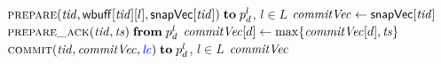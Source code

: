 \begin{algorithm*}[t]
\begin{algorithmic}[1]
      \hStatex
      \State \send $\textsc{prepare}(\mathit{tid}, {\sf wbuff}[\mathit{tid}][l], {\sf snapVec}[\mathit{tid}])
        \;{\bf to}\; p^{l}_{d}$, $l \in L$
        \label{line:commitcausal-call-prepare}
      \State \var $\mathit{commitVec} \gets {\sf snapVec}[\mathit{tid}]$
        \label{line:commitcausal-commitvc}
        \State \wait\receive $\textsc{prepare\_ack}(\mathit{tid}, \mathit{ts}) \;{\bf from}\; p^{l}_{d}$
          \label{line:commitcausal-wait-prepareack}
        \State $\mathit{commitVec}[d] \gets \max \{\mathit{commitVec}[d], \mathit{ts}\}$
          \label{line:commitcausal-commitvc-d}
      \EndFor
      \State \send $\Call{commit}{\tidvar, \commitvc, \lccolor{\lcvar}}
        \sendto p^{l}_{d}$, $l \in L$
      \label{line:commitcausal-call-commit}
      \State \Return $\mathit{commitVec}$
        \label{line:commitcausal-return}
        \label{line:commitcausal-commitvc-of-t-rw}
    \EndFunction
  \end{algorithmic}
\end{algorithm*}